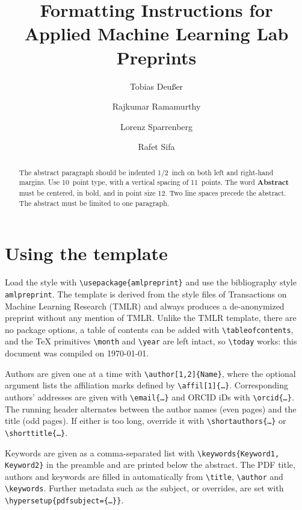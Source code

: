 \documentclass[10pt]{article} %
\title{Formatting Instructions for Applied Machine Learning Lab Preprints}
\author[1,2]{Tobias Deu{\ss}er}
\author[1,2,3]{Rajkumar Ramamurthy}
\author[1,2]{Lorenz Sparrenberg}
\author[1,2,4]{Rafet Sifa}
\affil[1]{University of Bonn, Germany}
\affil[2]{Lamarr-Institute for Machine Learning and Artificial Intelligence, Bonn, Germany}
\affil[3]{Accura AI Labs, D\"usseldorf, Germany}
\affil[4]{Fraunhofer IAIS, Sankt Augustin, Germany}
\begin{document}
\maketitle

\begin{abstract}
The abstract paragraph should be indented 1/2~inch on both left and
right-hand margins. Use 10~point type, with a vertical spacing of 11~points.
The word \textbf{\large Abstract} must be centered, in bold, and in point size 12. Two
line spaces precede the abstract. The abstract must be limited to one
paragraph.
\end{abstract}

\section{Using the template}

Load the style with {\tt {\textbackslash}usepackage\{amlpreprint\}} and use
the bibliography style {\tt amlpreprint}. The template is derived from the
style files of Transactions on Machine Learning Research (TMLR) and always
produces a de-anonymized preprint without any mention of TMLR. Unlike the
TMLR template, there are no package options, a table of contents can be
added with {\tt {\textbackslash}tableofcontents}, and the TeX primitives
{\tt {\textbackslash}month} and {\tt {\textbackslash}year} are left intact,
so {\tt {\textbackslash}today} works: this document was compiled on \today.

Authors are given one at a time with
{\tt {\textbackslash}author[1,2]\{Name\}}, where the optional argument lists
the affiliation marks defined by {\tt {\textbackslash}affil[1]\{\dots\}}.
Corresponding authors' addresses are given with
{\tt {\textbackslash}email\{\dots\}} and ORCID iDs with
{\tt {\textbackslash}orcid\{\dots\}}. The
running header alternates between the author names (even pages) and the
title (odd pages). If either is too long, override it with
{\tt {\textbackslash}shortauthors\{\dots\}} or
{\tt {\textbackslash}shorttitle\{\dots\}}.

Keywords are given as a comma-separated list with
{\tt {\textbackslash}keywords\{Keyword1, Keyword2\}} in the preamble and are
printed below the abstract. The PDF title, authors and keywords are filled in
automatically from {\tt {\textbackslash}title}, {\tt {\textbackslash}author}
and {\tt {\textbackslash}keywords}. Further metadata such as the subject, or
overrides, are set with {\tt {\textbackslash}hypersetup\{pdfsubject=\{\dots\}\}}.
\end{document}
